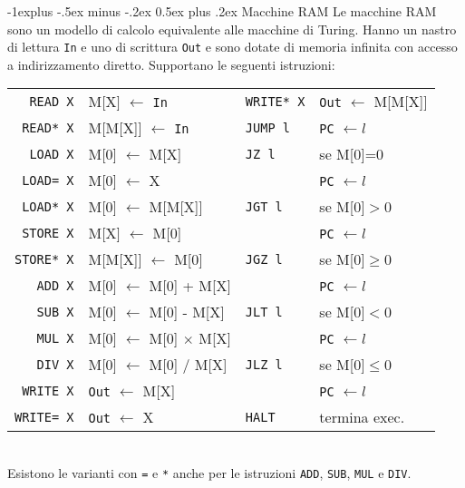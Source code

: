 \documentclass[10pt,landscape]{article}
\makeatletter
\renewcommand{\subsection}{\@startsection{subsection}{2}{0mm}%
                                {-1explus -.5ex minus -.2ex}%
                                {0.5ex plus .2ex}%
                                {\normalfont\large\bfseries}}
\makeatother
\begin{document}
\begin{multicols*}{4}
        \subsection{Macchine RAM}
        Le macchine RAM sono un modello di calcolo equivalente alle macchine di Turing. Hanno un nastro di lettura \texttt{In} e uno di scrittura \texttt{Out} e sono dotate di memoria infinita con accesso a indirizzamento diretto. Supportano le seguenti istruzioni:\\[3pt]
        \begin{tabular}{r l  l l}
                \verb|READ X|   & M[X] $\leftarrow$ \texttt{In}         & \verb|WRITE* X| & \texttt{Out} $\leftarrow$ M[M[X]] \\
                \verb|READ* X|  & M[M[X]]   $\leftarrow$ \texttt{In}    & \verb|JUMP l|   & \texttt{PC} $\leftarrow l$        \\
                \verb|LOAD X|   & M[0] $\leftarrow$ M[X]                & \verb|JZ l|     & se M[0]=0                         \\
                \verb|LOAD= X|  & M[0]   $\leftarrow$ X                 &                 & \texttt{PC} $\leftarrow l$        \\
                \verb|LOAD* X|  & M[0]   $\leftarrow$ M[M[X]]           & \verb|JGT l|    & se M[0]$>$0                       \\
                \verb|STORE X|  & M[X] $\leftarrow$ M[0]                &                 & \texttt{PC} $\leftarrow l$        \\
                \verb|STORE* X| & M[M[X]]   $\leftarrow$ M[0]           & \verb|JGZ l|    & se M[0]$\geq$0                    \\
                \verb|ADD X|    & M[0]  $\leftarrow$ M[0] + M[X]        &                 & \texttt{PC} $\leftarrow l$        \\
                \verb|SUB X|    & M[0]  $\leftarrow$ M[0] - M[X]        & \verb|JLT l|    & se M[0]$<$0                       \\
                \verb|MUL X|    & M[0]  $\leftarrow$ M[0] $\times$ M[X] &                 & \texttt{PC} $\leftarrow l$        \\
                \verb|DIV X|    & M[0]  $\leftarrow$ M[0] / M[X]        & \verb|JLZ l|    & se M[0]$\leq$0                    \\
                \verb|WRITE X|  & \texttt{Out} $\leftarrow$ M[X]        &                 & \texttt{PC} $\leftarrow l$        \\
                \verb|WRITE= X| & \texttt{Out} $\leftarrow$ X           & \verb|HALT|     & termina exec.                     \\
        \end{tabular} \\ 
        Esistono le varianti con \verb|=| e \verb|*| anche per le istruzioni \verb!ADD!, \verb|SUB|, \verb|MUL| e \verb|DIV|.

\end{multicols*}
\end{document}
